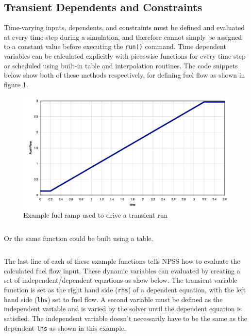 \documentclass[heading.tex]{subfiles}
\begin{document}
\subsection{Transient Dependents and Constraints}

Time-varying inputs, dependents, and constraints must be defined and evaluated at every time step during a simulation, and therefore cannot simply be
assigned to a constant value before executing the \texttt{run()} command. Time dependent variables can be calculated explicitly with
piecewise functions for every time step or scheduled using built-in table and interpolation routines.
The code snippets below show both of these methods respectively, for defining fuel flow as shown in figure \ref{f:ramp}.

\begin{figure}[H]
\centering
\includegraphics[width=1.0\textwidth]{images/fuelRamp}
\caption{Example fuel ramp used to drive a transient run}
\label{f:ramp}
\end{figure}

\begin{adjustwidth}{-1cm}{-1cm}
 \inputminted[]{c++}{code/rampFn}
 \end{adjustwidth} 
 
Or the same function could be built using a table. 
 
 \begin{adjustwidth}{-1cm}{-1cm}
 \inputminted[]{c++}{code/rampTb}
 \end{adjustwidth} 

The last line of each of these example functions tells NPSS how to evaluate the calculated fuel flow input.
These dynamic variables can evaluated by creating a set of independent/dependent equations as show below.
The transient variable function is set as the right hand side (\texttt{rhs}) of a dependent equation,
with the left hand side (\texttt{lhs}) set to fuel flow. 
A second variable must be defined as the independent variable and is varied by the solver until the dependent
equation is satisfied. The independent variable doesn't necessarily have to be the same as the dependent \texttt{lhs}
as shown in this example.
\end{document}
